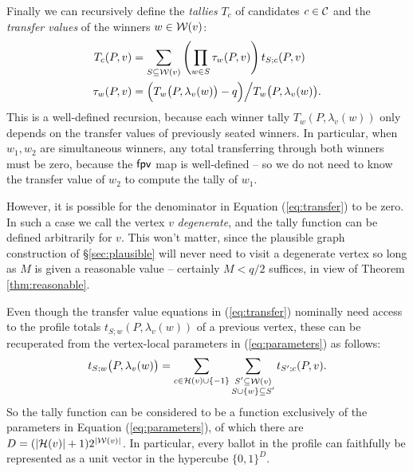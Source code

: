 Finally we can recursively define the \emph{tallies} $T_c$ of candidates $c\in \mathcal{C}$ and the \emph{transfer values} of the winners $w\in \mathcal{W}(v)$:
\begin{align}
	T_c(P,v) &= \sum_{S\subseteq \mathcal{W}(v)}\left(\prod_{w\in S} \tau_w (P,v)\right) t_{S;c}(P,v) 
	\label{eq:tally} \\
	\tau_w(P,v) &= \Big(T_w\big(P, \lambda_v(w)\big)-q\Big)\Big/ T_w\big(P, \lambda_v(w)\big).
	\label{eq:transfer}
\end{align}
This is a well-defined recursion, because each winner tally $T_w(P, \lambda_v(w))$ only depends on the transfer values of previously seated winners.
In particular, when $w_1, w_2$ are simultaneous winners, any total transferring through both winners must be zero, because the $\mathsf{fpv}$ map is well-defined -- so we do not need to know the transfer value of $w_2$ to compute the tally of $w_1$.

However, it is possible for the denominator in Equation (\ref{eq:transfer}) to be zero.
In such a case we call the vertex $v$ \emph{degenerate}, and the tally function can be defined arbitrarily for $v$.
This won't matter, since the plausible graph construction of \S\ref{sec:plausible} will never need to visit a degenerate vertex so long as $M$ is given a reasonable value -- certainly $M<q/2$ suffices, in view of Theorem \ref{thm:reasonable}.

Even though the transfer value equations in (\ref{eq:transfer}) nominally need access to the profile totals $t_{S;w}(P,\lambda_v(w))$ of a previous vertex, these can be recuperated from the vertex-local parameters in (\ref{eq:parameters}) as follows:
\[
	t_{S;w}\big(P,\lambda_v(w)\big) = \sum_{c\in\mathcal{H}(v) \cup\{-1\}}\sum_{\substack{
			S'\subseteq \mathcal{W}(v) \\
			S\cup\{w\}\subseteq S'
	}} t_{S';c}(P,v).
\]
So the tally function can be considered to be a function exclusively of the parameters in Equation (\ref{eq:parameters}), of which there are $D=(|\mathcal{H}(v)|+1)2^{|\mathcal{W}(v)|}$. In particular, every ballot in the profile can faithfully be represented as a unit vector in the hypercube $\{0,1\}^D$.
